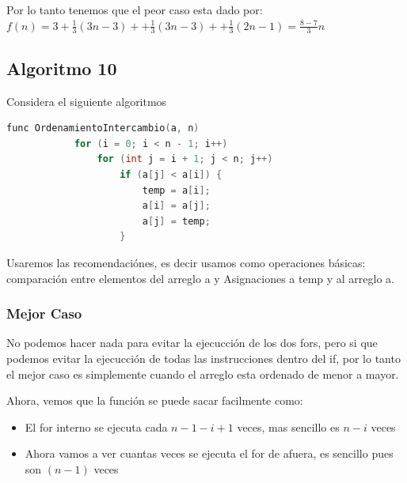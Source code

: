 \documentclass[12pt, fleqn]{article}                            %
\theoremstyle{break}                                            %
\begin{document}
            Por lo tanto tenemos que el peor caso esta dado por:
            $f(n) = 3 + \frac{1}{3}(3n-3)+ + \frac{1}{3}(3n-3) + + \frac{1}{3}(2n-1) = \frac{8 - 7}{3}n$



    \clearpage
    \subsection{Algoritmo 10}

        Considera el siguiente algoritmos
        \begin{lstlisting}[language=C, gobble=12, basicstyle=\small\color{white}]
            func OrdenamientoIntercambio(a, n)
            for (i = 0; i < n - 1; i++)              
                for (int j = i + 1; j < n; j++)      
                    if (a[j] < a[i]) {                
                        temp = a[i];
                        a[i] = a[j];
                        a[j] = temp;
                    }                               
        \end{lstlisting}

        Usaremos las recomendaciónes, es decir
        usamos como operaciones básicas:
        comparación entre elementos del arreglo a y
        Asignaciones a temp y al arreglo a.


        \subsubsection{Mejor Caso}

            No podemos hacer nada para evitar la ejecucción de los dos
            fors, pero si que podemos evitar la ejecucción de todas
            las instrucciones dentro del if, por lo tanto
            el mejor caso es simplemente cuando el arreglo esta ordenado de menor a mayor.

            Ahora, vemos que la función se puede sacar facilmente como:
            \begin{itemize}
                \item El for interno se ejecuta cada $n-1 - i + 1$ veces, mas sencillo
                es $n - i$ veces
                \item Ahora vamos a ver cuantas veces se ejecuta el for de afuera, es sencillo
                pues son $(n-1)$ veces 
            \end{itemize}
\end{document}
